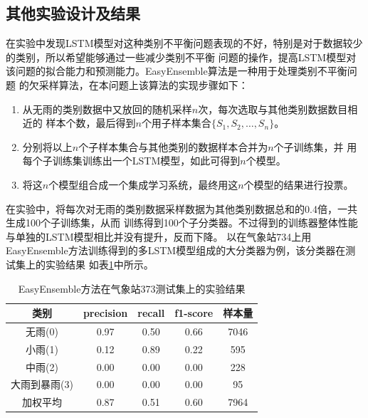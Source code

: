 \documentclass[UTF8]{ctexart}
\begin{document}
\subsection{其他实验设计及结果}
在实验中发现LSTM模型对这种类别不平衡问题表现的不好，特别是对于数据较少的类别，所以希望能够通过一些减少类别不平衡
问题的操作，提高LSTM模型对该问题的拟合能力和预测能力。EasyEnsemble算法是一种用于处理类别不平衡问题
的欠采样算法，在本问题上该算法的实现步骤如下：
\begin{enumerate}[(1)]
  \item 从无雨的类别数据中又放回的随机采样$n$次，每次选取与其他类别数据数目相近的
  样本个数，最后得到$n$个用子样本集合$\{S_1, S_2, \dots, S_n\}$。
  \item 分别将以上$n$个子样本集合与其他类别的数据样本合并为$n$个子训练集，并
  用每个子训练集训练出一个LSTM模型，如此可得到$n$个模型。
  \item 将这$n$个模型组合成一个集成学习系统，最终用这$n$个模型的结果进行投票。
\end{enumerate}

在实验中，将每次对无雨的类别数据采样数据为其他类别数据总和的0.4倍，一共生成100个子训练集，从而
训练得到100个子分类器。不过得到的训练器整体性能与单独的LSTM模型相比并没有提升，反而下降。
以在气象站734上用EasyEnsemble方法训练得到的多LSTM模型组成的大分类器为例，该分类器在测试集上的实验结果
如表\ref{tab:easyensemble}中所示。


\begin{table}[htb]
  \centering
  \begin{minipage}[t]{\linewidth}
  \centering
  \caption{EasyEnsemble方法在气象站373测试集上的实验结果}
  \label{tab:easyensemble}
    \begin{tabular}{ccccc}
      \toprule[1pt]
      类别 & precision & recall & f1-score & 样本量\\
      \midrule[0.5pt]
      无雨(0) & 0.97 & 0.50 & 0.66 & 7046\\
      小雨(1) & 0.12 & 0.89 & 0.22 & 595 \\
      中雨(2) & 0.00 & 0.00 & 0.00 & 228 \\
      大雨到暴雨(3) & 0.00 & 0.00 & 0.00 & 95\\
      加权平均 & 0.87 & 0.51 & 0.60 & 7964\\
      \bottomrule[1pt]
    \end{tabular}
  \end{minipage}
\end{table}
\end{document}
